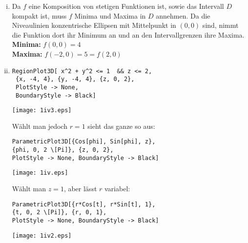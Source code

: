\documentclass[10pt,a4paper]{scrartcl}
\begin{document}
\begin{enumerate}[(i)]
\begin{minipage}{0.50\columnwidth}
\end{minipage}
\item 
Da $f$ eine Komposition von stetigen Funktionen ist, sowie das Intervall $D$ kompakt ist, muss $f$ Minima und Maxima in $D$ annehmen. Da die Niveaulinien konzentrische Ellipsen mit Mittelpunkt in $(0,0)$ sind, nimmt die Funktion dort ihr Minimum an und an den Intervallgrenzen ihre Maxima. %
\textbf{Minima: } $f(0,0) = 4$\\
\textbf{Maxima: } $f(-2,0) = 5 = f(2,0)$
\item 
\begin{minipage}{0.49\columnwidth}
\begin{lstlisting}[caption= Mathematica Code für den Graph von Z]
RegionPlot3D[ x^2 + y^2 <= 1  && z <= 2, 
 {x, -4, 4}, {y, -4, 4}, {z, 0, 2}, 
 PlotStyle -> None, 
 BoundaryStyle -> Black]
\end{lstlisting}
\end{minipage}
\begin{minipage}{0.50\columnwidth}
\begin{center}
\texttt{[image: 1iv3.eps]} 
\end{center}
\end{minipage}
\begin{minipage}{0.49\columnwidth}
Wählt man jedoch $r=1$ sieht das ganze so aus:
\begin{lstlisting}[caption= Mathematica Code für den Graph von Z]
ParametricPlot3D[{Cos[phi], Sin[phi], z}, 
{phi, 0, 2 \[Pi]}, {z, 0, 2}, 
PlotStyle -> None, BoundaryStyle -> Black]
\end{lstlisting}
\end{minipage}
\begin{minipage}{0.50\columnwidth}
\begin{center}
\texttt{[image: 1iv.eps]} 
\end{center}
\end{minipage}
\begin{minipage}{0.50\columnwidth}
Wählt man $z = 1$, aber lässt $r$ variabel:
\begin{lstlisting}[caption= Mathematica Code für den Graph von Z]
ParametricPlot3D[{r*Cos[t], r*Sin[t], 1}, 
{t, 0, 2 \[Pi]}, {r, 0, 1}, 
PlotStyle -> None, BoundaryStyle -> Black]
\end{lstlisting}
\end{minipage}
\begin{minipage}{0.50\columnwidth}
\begin{center}
\texttt{[image: 1iv2.eps]} 
\end{center}
\end{minipage}
\end{enumerate}
\end{document}
